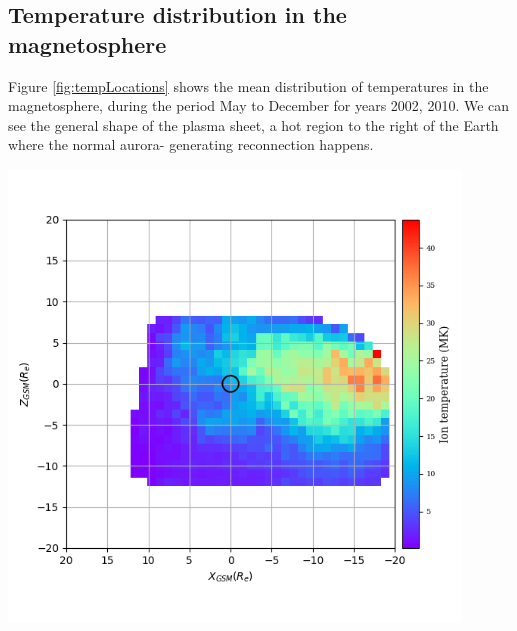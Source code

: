 \documentclass{article}
\newenvironment{Figure}
  {\par\medskip\noindent\minipage{\linewidth}}
  {\endminipage\par\medskip}
\begin{document}
\subsection{Temperature distribution in the magnetosphere}
Figure \ref{fig:tempLocations} shows the mean distribution of temperatures in the magnetosphere, during the period May to December for years 2002, 2010. We can see the general shape of the plasma sheet, a hot region to the right of the Earth where the normal aurora- generating reconnection happens.

\begin{Figure}
    \begin{minipage}[c]{0.57\textwidth}
        \centering
        \includegraphics[width=0.9\textwidth]{tempLocations.png}
    \end{minipage}\hfill
    \begin{minipage}[c]{0.4\textwidth}
        \label{fig:tempLocations}
    \end{minipage}
\end{Figure}
\end{document}

